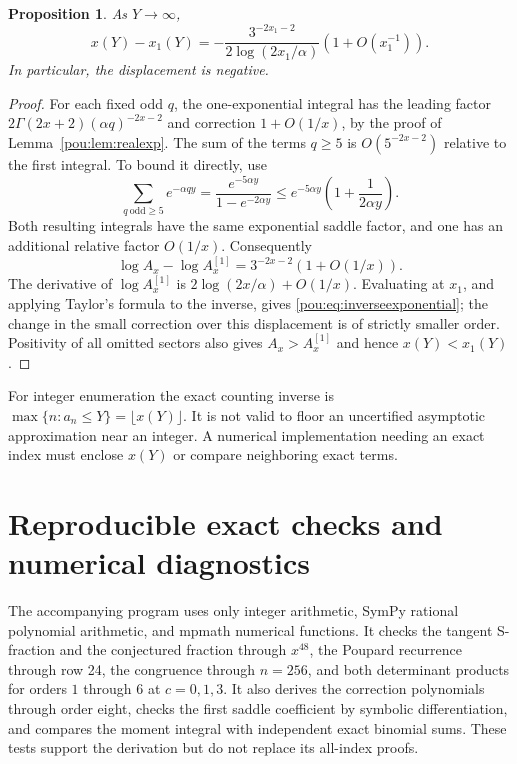 \documentclass[11pt]{article}
\newtheorem{proposition}[theorem]{Proposition}
\theoremstyle{definition}
\theoremstyle{remark}
\begin{document}
\begin{proposition}\label{pou:prop:inverseexponential}
As $Y\to\infty$,
\begin{equation}\label{pou:eq:inverseexponential}
 x(Y)-x_1(Y)=
 -\frac{3^{-2x_1-2}}{2\log(2x_1/\alpha)}
       \left(1+O(x_1^{-1})\right).
\end{equation}
In particular, the displacement is negative.
\end{proposition}
\begin{proof}
For each fixed odd $q$, the one-exponential integral has the leading
factor $2\Gamma(2x+2)(\alpha q)^{-2x-2}$ and correction
$1+O(1/x)$, by the proof of Lemma~\ref{pou:lem:realexp}.
The sum of the terms $q\ge5$ is $O(5^{-2x-2})$ relative to the first
integral.  To bound it directly, use
\[
 \sum_{q\ \mathrm{odd}\ge5}e^{-\alpha qy}
 =\frac{e^{-5\alpha y}}{1-e^{-2\alpha y}}
 \le e^{-5\alpha y}\left(1+\frac1{2\alpha y}\right).
\]
Both resulting integrals have the same exponential saddle factor, and
one has an additional relative factor $O(1/x)$.
Consequently
\[
 \log A_x-\log A_x^{[1]}
 =3^{-2x-2}(1+O(1/x)).
\]
The derivative of $\log A_x^{[1]}$ is
$2\log(2x/\alpha)+O(1/x)$.  Evaluating at $x_1$, and applying Taylor's
formula to the inverse, gives \eqref{pou:eq:inverseexponential}; the change
in the small correction over this displacement is of strictly smaller
order.  Positivity of all omitted sectors also gives $A_x>A_x^{[1]}$
and hence $x(Y)<x_1(Y)$.
\end{proof}

For integer enumeration the exact counting inverse is
$\max\{n:a_n\le Y\}=\lfloor x(Y)\rfloor$.
It is not valid to floor an uncertified asymptotic approximation near an
integer.  A numerical implementation needing an exact index must enclose
$x(Y)$ or compare neighboring exact terms.

\section{Reproducible exact checks and numerical diagnostics}\label{pou:sec:checks}

The accompanying program  uses only integer arithmetic,
SymPy rational polynomial arithmetic, and mpmath numerical functions.
It checks the tangent S-fraction and the conjectured fraction through
$x^{48}$, the Poupard recurrence through row 24, the congruence through
$n=256$, and both determinant products for orders $1$ through $6$ at
$c=0,1,3$.  It also derives the correction polynomials through order eight,
checks the first saddle coefficient by symbolic differentiation, and
compares the moment integral with independent exact binomial sums.
These tests support the derivation but do not replace its all-index proofs.
\end{document}
